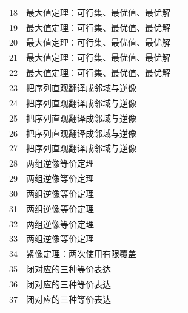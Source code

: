 \documentclass[11pt,a4paper]{article}
\theoremstyle{definition}\newtheorem{definition}{定义}\newtheorem{example}{例}
\begin{document}
\begin{longtable}{r p{.66\linewidth} r}
18 & 最大值定理：可行集、最优值、最优解 & \pageref{g:108:15}\\

19 & 最大值定理：可行集、最优值、最优解 & \pageref{g:108:15}\\

20 & 最大值定理：可行集、最优值、最优解 & \pageref{g:108:15}\\

21 & 最大值定理：可行集、最优值、最优解 & \pageref{g:108:15}\\

22 & 最大值定理：可行集、最优值、最优解 & \pageref{g:108:15}\\

23 & 把序列直观翻译成邻域与逆像 & \pageref{g:108:23}\\

24 & 把序列直观翻译成邻域与逆像 & \pageref{g:108:23}\\

25 & 把序列直观翻译成邻域与逆像 & \pageref{g:108:23}\\

26 & 把序列直观翻译成邻域与逆像 & \pageref{g:108:23}\\

27 & 把序列直观翻译成邻域与逆像 & \pageref{g:108:23}\\

28 & 两组逆像等价定理 & \pageref{g:108:28}\\

29 & 两组逆像等价定理 & \pageref{g:108:28}\\

30 & 两组逆像等价定理 & \pageref{g:108:28}\\

31 & 两组逆像等价定理 & \pageref{g:108:28}\\

32 & 两组逆像等价定理 & \pageref{g:108:28}\\

33 & 两组逆像等价定理 & \pageref{g:108:28}\\

34 & 紧像定理：两次使用有限覆盖 & \pageref{g:108:34}\\

35 & 闭对应的三种等价表达 & \pageref{g:108:35}\\

36 & 闭对应的三种等价表达 & \pageref{g:108:35}\\

37 & 闭对应的三种等价表达 & \pageref{g:108:35}\\


\end{longtable}
\end{document}

